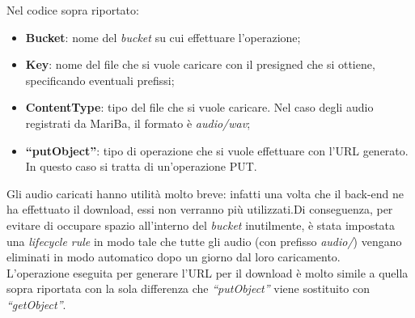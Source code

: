 		Nel codice sopra riportato:
		\begin{itemize}
			\item \textbf{Bucket}: nome del \emph{bucket} su cui effettuare l'operazione;
			\item \textbf{Key}: nome del file che si vuole caricare con il presigned che si ottiene, specificando eventuali prefissi;
			\item \textbf{ContentType}: tipo del file che si vuole caricare. Nel caso degli audio registrati da MariBa, il formato è \emph{audio/wav};
			\item \textbf{``putObject''}: tipo di operazione che si vuole effettuare con l'URL generato. In questo caso si tratta di un'operazione PUT.
		\end{itemize}
		
		Gli audio caricati hanno utilità molto breve: infatti una volta che il back-end ne ha effettuato il download, 
		essi non verranno più utilizzati.Di conseguenza, per evitare di occupare spazio all'interno del \emph{bucket} inutilmente, è stata impostata una \emph{lifecycle rule} in modo tale che tutte gli audio (con prefisso \emph{audio/}) vengano eliminati in modo automatico dopo un giorno dal loro caricamento. \\
		
		\noindent  L'operazione eseguita per generare l'URL per il download è molto simile a quella sopra riportata con la sola differenza che \emph{``putObject''} viene sostituito con \emph{``getObject''}.
	
